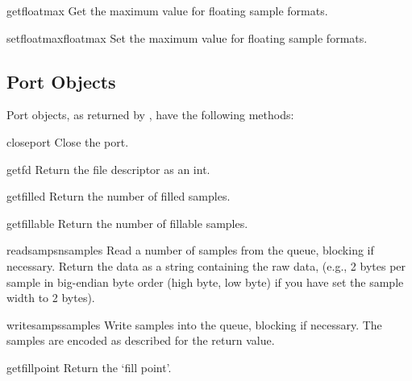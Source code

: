 \begin{methoddesc}{getfloatmax}{}
Get the maximum value for floating sample formats.
\end{methoddesc}

\begin{methoddesc}{setfloatmax}{floatmax}
Set the maximum value for floating sample formats.
\end{methoddesc}


\subsection{Port Objects \label{al-port-objects}}

Port objects, as returned by , have the following
methods:

\begin{methoddesc}{closeport}{}
Close the port.
\end{methoddesc}

\begin{methoddesc}{getfd}{}
Return the file descriptor as an int.
\end{methoddesc}

\begin{methoddesc}{getfilled}{}
Return the number of filled samples.
\end{methoddesc}

\begin{methoddesc}{getfillable}{}
Return the number of fillable samples.
\end{methoddesc}

\begin{methoddesc}{readsamps}{nsamples}
Read a number of samples from the queue, blocking if necessary.
Return the data as a string containing the raw data, (e.g., 2 bytes per
sample in big-endian byte order (high byte, low byte) if you have set
the sample width to 2 bytes).
\end{methoddesc}

\begin{methoddesc}{writesamps}{samples}
Write samples into the queue, blocking if necessary.  The samples are
encoded as described for the  return value.
\end{methoddesc}

\begin{methoddesc}{getfillpoint}{}
Return the `fill point'.
\end{methoddesc}

